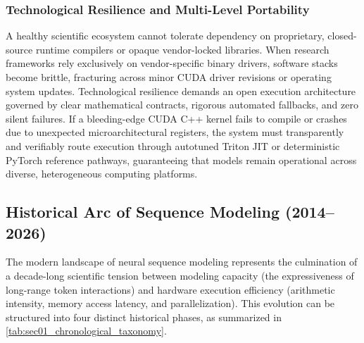 \subsubsection{Technological Resilience and Multi-Level Portability}
\label{subsubsec:resilience_portability}

A healthy scientific ecosystem cannot tolerate dependency on proprietary, closed-source runtime compilers or opaque vendor-locked libraries.
When research frameworks rely exclusively on vendor-specific binary drivers, software stacks become brittle, fracturing across minor CUDA driver revisions or operating system updates.
Technological resilience demands an open execution architecture governed by clear mathematical contracts, rigorous automated fallbacks, and zero silent failures.
If a bleeding-edge CUDA C++ kernel fails to compile or crashes due to unexpected microarchitectural registers, the system must transparently and verifiably route execution through autotuned Triton JIT or deterministic PyTorch reference pathways, guaranteeing that models remain operational across diverse, heterogeneous computing platforms.


\subsection{Historical Arc of Sequence Modeling (2014–2026)}
\label{subsec:historical_arc}

The modern landscape of neural sequence modeling represents the culmination of a decade-long scientific tension between modeling capacity (the expressiveness of long-range token interactions) and hardware execution efficiency (arithmetic intensity, memory access latency, and parallelization).
This evolution can be structured into four distinct historical phases, as summarized in \autoref{tab:sec01_chronological_taxonomy}.

